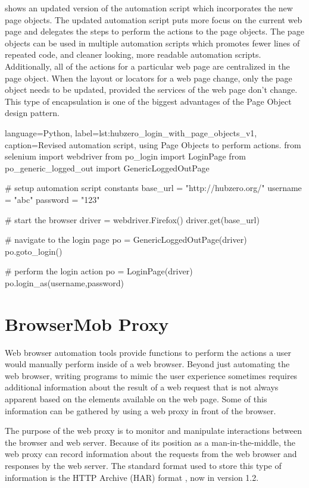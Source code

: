  shows an updated version
of the automation script which incorporates the new page objects.  The updated
automation script puts more focus on the current web page and delegates the
steps to perform the actions to the page objects. The page objects can be used
in multiple automation scripts which promotes fewer lines of repeated code, and
cleaner looking, more readable automation scripts.  Additionally, all of the
actions for a particular web page are centralized in the page object.  When the
layout or locators for a web page change, only the page object needs to be
updated, provided the services of the web page don't change. This type of
encapsulation is one of the biggest advantages of the Page Object design
pattern.


\begin{xcode}{%
  language=Python,%
  label=lst:hubzero_login_with_page_objects_v1,%
  caption={Revised automation script, using Page Objects to perform actions.}%
}
from selenium import webdriver
from po_login import LoginPage
from po_generic_logged_out import GenericLoggedOutPage

# setup automation script constants
base_url = "http://hubzero.org/"
username = "abc"
password = "123"

# start the browser
driver = webdriver.Firefox()
driver.get(base_url)

# navigate to the login page
po = GenericLoggedOutPage(driver)
po.goto_login()

# perform the login action
po = LoginPage(driver)
po.login_as(username,password)
\end{xcode}


\section{BrowserMob Proxy}
\label{sec:external_libs_bmp}

Web browser automation tools provide functions to perform the actions a user
would manually perform inside of a web browser.  Beyond just automating the web
browser, writing programs to mimic the user experience sometimes requires
additional information about the result of a web request that is not always
apparent based on the elements available on the web page. Some of this
information can be gathered by using a web proxy in front of the browser.


The purpose of the web proxy is to monitor and manipulate interactions between
the browser and web server. Because of its position as a man-in-the-middle, the
web proxy can record information about the requests from the web browser and
responses by the web server. The standard format used to store this type of
information is the HTTP Archive (HAR) format \cite{HAR12Format:Online}, now in
version 1.2.

